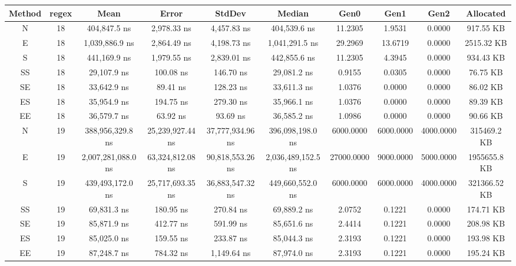 \begin{sidewaystable}
    \begin{tabular}{|c|c|c|c|c|c|c|c|c|c|}
        \hline
        Method & regex & Mean               & Error            & StdDev           & Median             & Gen0       & Gen1      & Gen2      & Allocated    \\
        \hline
        N      & 18    & 404,847.5 ns       & 2,978.33 ns      & 4,457.83 ns      & 404,539.6 ns       & 11.2305    & 1.9531    & 0.0000    & 917.55 KB    \\
        E      & 18    & 1,039,886.9 ns     & 2,864.49 ns      & 4,198.73 ns      & 1,041,291.5 ns     & 29.2969    & 13.6719   & 0.0000    & 2515.32 KB   \\
        S      & 18    & 441,169.9 ns       & 1,979.55 ns      & 2,839.01 ns      & 442,855.6 ns       & 11.2305    & 4.3945    & 0.0000    & 934.43 KB    \\
        SS     & 18    & 29,107.9 ns        & 100.08 ns        & 146.70 ns        & 29,081.2 ns        & 0.9155     & 0.0305    & 0.0000    & 76.75 KB     \\
        SE     & 18    & 33,642.9 ns        & 89.41 ns         & 128.23 ns        & 33,611.3 ns        & 1.0376     & 0.0000    & 0.0000    & 86.02 KB     \\
        ES     & 18    & 35,954.9 ns        & 194.75 ns        & 279.30 ns        & 35,966.1 ns        & 1.0376     & 0.0000    & 0.0000    & 89.39 KB     \\
        EE     & 18    & 36,579.7 ns        & 63.92 ns         & 93.69 ns         & 36,585.2 ns        & 1.0986     & 0.0000    & 0.0000    & 90.66 KB     \\
        N      & 19    & 388,956,329.8 ns   & 25,239,927.44 ns & 37,777,934.96 ns & 396,098,198.0 ns   & 6000.0000  & 6000.0000 & 4000.0000 & 315469.2 KB  \\
        E      & 19    & 2,007,281,088.0 ns & 63,324,812.08 ns & 90,818,553.26 ns & 2,036,489,152.5 ns & 27000.0000 & 9000.0000 & 5000.0000 & 1955655.8 KB \\
        S      & 19    & 439,493,172.0 ns   & 25,717,693.35 ns & 36,883,547.32 ns & 449,660,552.0 ns   & 6000.0000  & 6000.0000 & 4000.0000 & 321366.52 KB \\
        SS     & 19    & 69,831.3 ns        & 180.95 ns        & 270.84 ns        & 69,889.2 ns        & 2.0752     & 0.1221    & 0.0000    & 174.71 KB    \\
        SE     & 19    & 85,871.9 ns        & 412.77 ns        & 591.99 ns        & 85,651.6 ns        & 2.4414     & 0.1221    & 0.0000    & 208.98 KB    \\
        ES     & 19    & 85,025.0 ns        & 159.55 ns        & 233.87 ns        & 85,044.3 ns        & 2.3193     & 0.1221    & 0.0000    & 193.98 KB    \\
        EE     & 19    & 87,248.7 ns        & 784.32 ns        & 1,149.64 ns      & 87,974.0 ns        & 2.3193     & 0.1221    & 0.0000    & 195.24 KB    \\
        \hline
    \end{tabular}
\end{sidewaystable}